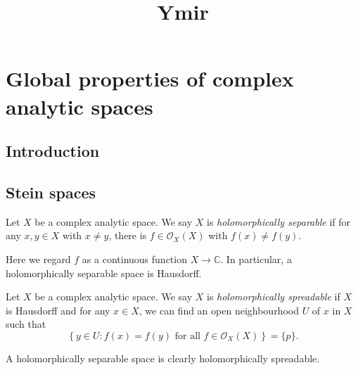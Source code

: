 
\title{Ymir}

\maketitle
\tableofcontents

\chapter*{Global properties of complex analytic spaces}\label{chap-CGlobalProperty}

\section{Introduction}\label{sec-introduction-CGlobalProperty}

\section{Stein spaces}
\begin{definition}
    Let $X$ be a complex analytic space. We say $X$ is \emph{holomorphically separable} if for any $x,y\in X$ with $x\neq y$, there is $f\in \mathcal{O}_X(X)$ with $f(x)\neq f(y)$.
\end{definition}
Here we regard $f$ as a continuous function $X\rightarrow \mathbb{C}$. In particular, a holomorphically separable space is Hausdorff.

\begin{definition}
    Let $X$ be a complex analytic space. We say $X$ is \emph{holomorphically spreadable} if $X$ is Hausdorff and for any $x\in X$, we can find an open neighbourhood $U$ of $x$ in $X$ such that
    \[
        \left\{y\in U:f(x)=f(y)\text{ for all }f\in \mathcal{O}_X(X) \right\} =\{p\}.
    \]
\end{definition}
A holomorphically separable space is clearly holomorphically spreadable.



